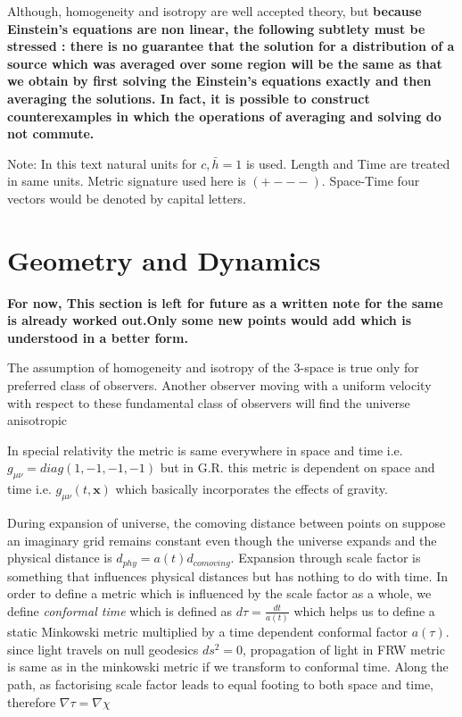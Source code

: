 \documentclass[12pt]{report}
\newcommand{\mbf}[1]{\mathbf{#1}}
\newcommand{\tit}[1]{\textit{#1}}
\newcommand{\cbox}{tcolorbox}
\begin{document}
\begin{\cbox}
Although, homogeneity and isotropy are well accepted theory, but \textbf{because Einstein's equations are non linear, the following subtlety must be stressed : there is no guarantee that the solution for a distribution of a source which was averaged over some region will be the same as that we obtain by first solving the Einstein's equations exactly and then averaging the solutions. In fact, it is possible to construct counterexamples in which the operations of averaging and solving do not commute.}
\end{\cbox}

Note: In this text natural units for $c,\bar{h}=1$ is used. Length and Time are treated in same units. Metric signature used here is $(+---)$. Space-Time four vectors would be denoted by capital letters.
\chapter{Geometry and Dynamics}
\textbf{For now, This section is left for future as a written note for the same is already worked out.Only some new points would add which is understood in a better form.}

\begin{\cbox}
The assumption of homogeneity and isotropy of the 3-space is true only for preferred class of observers. Another observer moving with a uniform velocity with respect to these fundamental class of observers will find the universe anisotropic
\end{\cbox}

In special relativity the metric is same everywhere in space and time i.e.
$g_{\mu\nu}=diag(1,-1,-1,-1)$ but in G.R. this metric is dependent on space and time i.e. $g_{\mu\nu}(t,\mbf{x})$ which basically incorporates the effects of gravity.


During expansion of universe, the comoving distance between points on suppose an imaginary grid remains constant even though the universe expands and the physical distance is $d_{phy}=a(t)d_{comoving}$. Expansion through scale factor is something that influences physical distances but has nothing to do with time. In order to define a metric which is influenced by the scale factor as a whole, we define \tit{conformal time} which is defined as $d\tau=\frac{dt}{a(t)}$ which helps us to define a static Minkowski metric multiplied by a time dependent conformal factor $a(\tau)$. since light travels on null geodesics $ds^2=0$, propagation of light in FRW metric is same as in the minkowski metric if we transform to conformal time. Along the path, as factorising scale factor leads to equal footing to both space and time, therefore $\nabla\tau=\nabla\chi$
\end{document}
